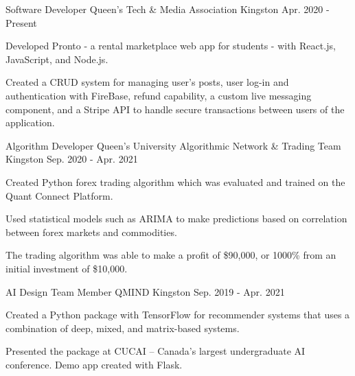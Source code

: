

\begin{cventries}

  \cventry
    {Software Developer} %
    {Queen’s Tech \& Media Association} %
    {Kingston} %
    {Apr. 2020 - Present} %
    {
      \begin{cvitems} %
        \item {Developed Pronto - a rental marketplace web app for students - with React.js, JavaScript, and Node.js.}
        \item {Created a CRUD system for managing user’s posts, user log-in and authentication with FireBase, refund capability, a custom live messaging component, and a Stripe API to handle secure transactions between users of the application.}
      \end{cvitems}
    }

  \cventry
    {Algorithm Developer} %
    {Queen's University Algorithmic Network \& Trading Team} %
    {Kingston} %
    {Sep. 2020 - Apr. 2021} %
    {
      \begin{cvitems} %
        \item {Created Python forex trading algorithm which was evaluated and trained on the Quant Connect Platform.}
        \item {Used statistical models such as ARIMA to make predictions based on correlation between forex markets and commodities.}
        \item {The trading algorithm was able to make a profit of \$90,000, or 1000\% from an initial investment of \$10,000.}
      \end{cvitems}
    }

  \cventry
    {AI Design Team Member} %
    {QMIND} %
    {Kingston} %
    {Sep. 2019 - Apr. 2021} %
    {
      \begin{cvitems} %
        \item {Created a Python package with TensorFlow for recommender systems that uses a combination of deep, mixed, and matrix-based systems.}
        \item {Presented the package at CUCAI – Canada’s largest undergraduate AI conference. Demo app created with Flask.}
      \end{cvitems}
    }
    

\end{cventries}

